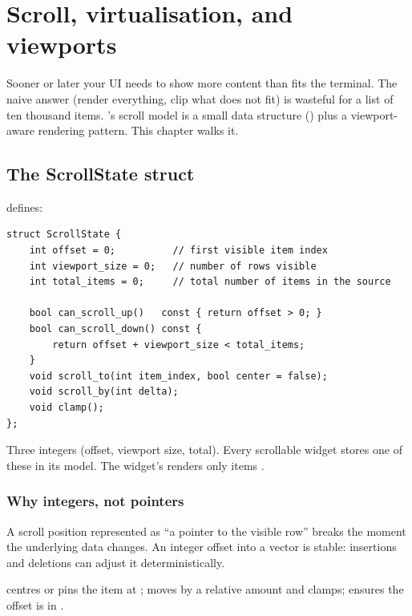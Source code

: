 \chapter{Scroll, virtualisation, and viewports}
\label{ch:scroll}

\begin{aside}
Sooner or later your UI needs to show more content than fits the
terminal. The naive answer (render everything, clip what does
not fit) is wasteful for a list of ten thousand items.
\maya{}'s scroll model is a small data structure
() plus a viewport-aware rendering pattern.
This chapter walks it.
\end{aside}

\section{The ScrollState struct}

 defines:

\begin{lstlisting}
struct ScrollState {
    int offset = 0;          // first visible item index
    int viewport_size = 0;   // number of rows visible
    int total_items = 0;     // total number of items in the source

    bool can_scroll_up()   const { return offset > 0; }
    bool can_scroll_down() const {
        return offset + viewport_size < total_items;
    }
    void scroll_to(int item_index, bool center = false);
    void scroll_by(int delta);
    void clamp();
};
\end{lstlisting}

Three integers (offset, viewport size, total). Every scrollable
widget stores one of these in its model. The widget's
 renders only items \code{[offset, offset+viewport\_size)}.

\subsection*{Why integers, not pointers}

A scroll position represented as ``a pointer to the visible row''
breaks the moment the underlying data changes. An integer offset
into a vector is stable: insertions and deletions can adjust it
deterministically.

 centres or pins the item at
;  moves by a relative
amount and clamps;  ensures the offset is in
.

